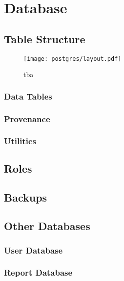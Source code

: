 \chapter{Database}

\section{Table Structure}

\begin{figure}[tb]
  \centering
  \texttt{[image: postgres/layout.pdf]}
  \caption{tba}
  \label{fig:db-structure}
\end{figure}


\subsection{Data Tables}
\subsection{Provenance}
\label{sec:provenance-tables}
\subsection{Utilities}
\section{Roles}
\section{Backups}
\section{Other Databases}
\subsection{User Database}
\subsection{Report Database}
